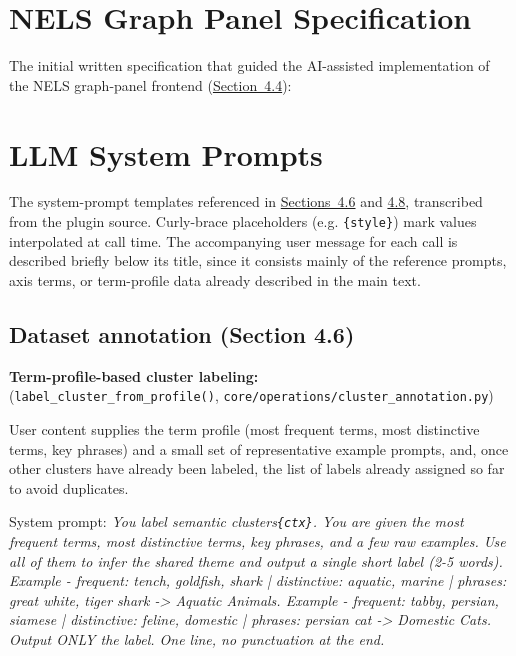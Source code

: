 \section{NELS Graph Panel Specification}\label{app:2}

The initial written specification that guided the AI-assisted implementation of the NELS graph-panel frontend (\hyperref[sec:4.4]{Section~4.4}):



\section{LLM System Prompts}\label{app:3}

The system-prompt templates referenced in \hyperref[sec:4.6]{Sections~4.6} and \hyperref[sec:4.8]{4.8}, transcribed from the plugin source. Curly-brace placeholders (e.g. \texttt{\{style\}}) mark values interpolated at call time. The accompanying user message for each call is described briefly below its title, since it consists mainly of the reference prompts, axis terms, or term-profile data already described in the main text.

\subsection{Dataset annotation (Section 4.6)}\label{app:3-dataset-annotation}

\textbf{Term-profile-based cluster labeling:}\\
(\texttt{label\_cluster\_from\_profile()}, \texttt{core/operations/cluster\_annotation.py})

User content supplies the term profile (most frequent terms, most distinctive terms, key phrases) and a small set of representative example prompts, and, once other clusters have already been labeled, the list of labels already assigned so far to avoid duplicates.

System prompt: \textit{You label semantic clusters\texttt{\{ctx\}}. You are given the most frequent terms, most distinctive terms, key phrases, and a few raw examples. Use all of them to infer the shared theme and output a single short label (2-5 words). Example - frequent: tench, goldfish, shark | distinctive: aquatic, marine | phrases: great white, tiger shark -> Aquatic Animals. Example - frequent: tabby, persian, siamese | distinctive: feline, domestic | phrases: persian cat -> Domestic Cats. Output ONLY the label. One line, no punctuation at the end.}

